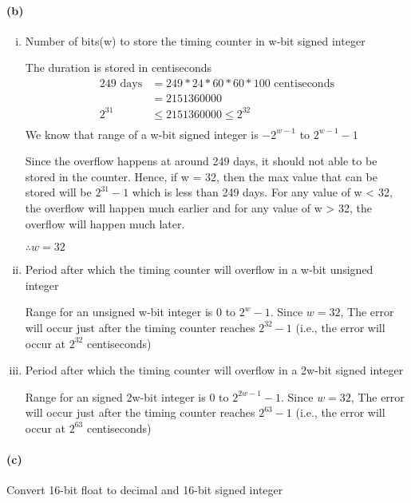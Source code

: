 \documentclass{article}
\begin{document}
\paragraph{(b)} 
\begin{enumerate}[(i)]
\item\label{item:3b1} Number of bits(w) to store the timing counter in w-bit signed integer\newline

  The duration is stored in centiseconds
\begin{align*}
249\text{ days} &= 249 * 24 * 60 * 60 * 100 \text{ centiseconds}\\
                &= 2151360000\\
  2^{31} &\leq 2151360000 \leq 2^{32}\\
\end{align*}
We know that range of a w-bit signed integer is $-2^{w-1}$ to $2^{w-1} - 1$\newline

Since the overflow happens at around 249 days, it should not able to be stored in the counter. Hence, if w = 32, then the max value that can be stored will be $2^{31} - 1$ which is less than 249 days. For any value of w < 32, the overflow will happen much earlier and for any value of w > 32, the overflow will happen much later.\newline

$\therefore w = 32$ 


\item\label{item:3b2} Period after which the timing counter will overflow in a w-bit unsigned integer\newline

  Range for an unsigned w-bit integer is $0$ to $2^w - 1$. Since $w = 32$, The error will occur just after the timing counter reaches $2^{32} - 1$ (i.e., the error will occur at $2^{32}$ centiseconds)

\item\label{item:3b3} Period after which the timing counter will overflow in a 2w-bit signed integer\newline

  Range for an signed 2w-bit integer is $0$ to $2^{2w -1} - 1$. Since $w = 32$, The error will occur just after the timing counter reaches $2^{63} - 1$ (i.e., the error will occur at $2^{63}$ centiseconds)
\end{enumerate}

\paragraph{(c)} Convert 16-bit float to decimal and 16-bit signed integer\newline
\end{document}
